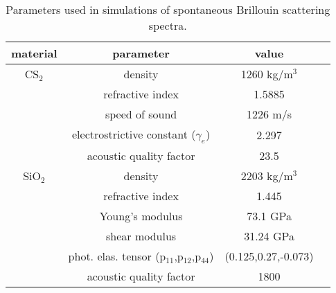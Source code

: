 \begin{table}[ht]
\begin{tabular}{|c|c|c|c|}
\hline material   & parameter 		& value 		            \\
\hline CS$_2$ 	& density      		&  1260   kg/m$^3$  	    \\
 		& refractive index 		&  1.5885		              \\
 		& speed of sound   		&  1226     m/s	             \\
		&electrostrictive constant ($\gamma_e$)  & 2.297   \\
  & acoustic quality factor & 23.5 \\
\hline SiO$_2$ 	&density  		     	&  2203     kg/m$^3$	     \\
 		& refractive index  		&  1.445    		    \\
 		& Young's modulus		&  73.1     GPa		    \\
 		& shear modulus   		&  31.24    GPa		    \\
 		& phot. elas. tensor (p$_{11}$,p$_{12}$,p$_{44}$) & (0.125,0.27,-0.073)   \\
   & acoustic quality factor & 1800 \\
\hline
\end{tabular}
\centering
\caption{Parameters used in simulations of spontaneous Brillouin scattering spectra.}
\label{parameters}
\end{table}

